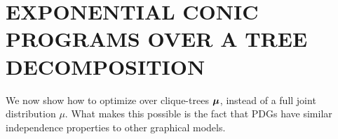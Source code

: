 \documentclass[twoside]{article}
\begin{document}




\section{EXPONENTIAL CONIC PROGRAMS OVER A TREE DECOMPOSITION }
    \label{sec:clique-tree-expcone}

We now show how to optimize over clique-trees $\boldsymbol\mu$, instead of a full joint distribution $\mu$. What makes this possible is the fact that PDGs have similar independence properties to other graphical models. 
\end{document}
